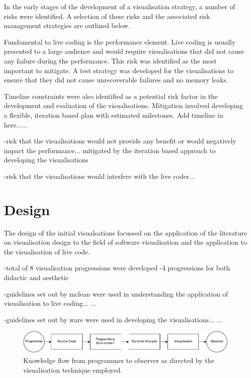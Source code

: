 In the early stages of the development of a visualisation strategy, a number of risks were identified. A selection of these risks and the associated risk management strategies are outlined below.

Fundamental to live coding is the performance element. Live coding is usually presented to a large audience and would require visualisations that did not cause any failure during the performance. This risk was identified as the most important to mitigate. A test strategy was developed for the visualisations to ensure that they did not cause unrecoverable failures and no memory leaks.

Timeline constraints were also identified as a potential risk factor in the development and evaluation of the visualisations. Mitigation involved developing a flexible, iteration based plan with estimated milestones. {\color{red} Add timeline in here......}

-risk that the visualisations would not provide any benefit or would negatively impact the performance... mitigated by the iteration based approach to developing the visualisations

-risk that the visualisations would interfere with the live coder...



\section{Design}

The design of the initial visualsations focussed on the application of the literature on visualisation design to the field of software visualisation and the application to the visualisation of live code.

-total of 8 visualisation progressions were developed
-4 progressions for both didactic and aesthetic

-guidelines set out by mclean were used in understanding the application of visualisation to live coding...
\cite{McLean2010a}...

-guidelines set out by ware were used in developing the visualisations...
\cite{Ware2013a}...


\begin{figure}
  \centering \includegraphics[width=\columnwidth]{../images/diagrams/knowledge-flow-initial.pdf}
  \caption{Knowledge flow from programmer to observer as directed by the visualisation technique employed.}
\label{fig:knowledge-flow-initial}
\end{figure}


